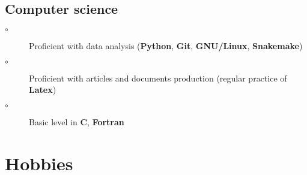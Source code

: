 \documentclass[11pt,a4paper,roman]{moderncv}
\begin{document}

\subsection{Computer science}
\begin{description}
    \item[\hspace{\hintscolumnwidth}\hspace{\separatorcolumnwidth}\color{blue}$\circ$]
    Proficient with data analysis (\textbf{Python}, \textbf{Git}, \textbf{GNU/Linux}, \textbf{Snakemake})
    \item[\hspace{\hintscolumnwidth}\hspace{\separatorcolumnwidth}\color{blue}$\circ$]
    Proficient with articles and documents production (regular practice of \textbf{Latex})
    \item[\hspace{\hintscolumnwidth}\hspace{\separatorcolumnwidth}\color{blue}$\circ$]
    Basic level in \textbf{C}, \textbf{Fortran}
\end{description}

\section{Hobbies}
\end{document}
